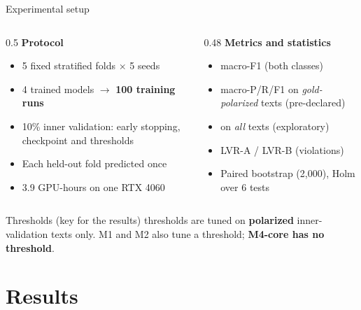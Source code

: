\begin{frame}{Experimental setup}
\begin{columns}[T]
\begin{column}{0.5\textwidth}
\textbf{Protocol}
\begin{itemize}\small
\item 5 fixed stratified folds $\times$ 5 seeds
\item 4 trained models $\to$ \textbf{100 training runs}
\item 10\% inner validation: early stopping, checkpoint and thresholds
\item Each held-out fold predicted once
\item 3.9 GPU-hours on one RTX 4060
\end{itemize}
\end{column}
\begin{column}{0.48\textwidth}
\textbf{Metrics and statistics}
\begin{itemize}\small
\item \DET{} macro-F1 (both classes)
\item \TYPE{} macro-P/R/F1 on \emph{gold-polarized} texts (pre-declared)
\item \TYPE{} on \emph{all} texts (exploratory)
\item LVR-A / LVR-B (violations)
\item Paired bootstrap (2{,}000), Holm over 6 tests
\end{itemize}
\end{column}
\end{columns}
\vspace{6pt}
\begin{alertblock}{Thresholds (key for the results)}
\small \TYPE{} thresholds are tuned on \textbf{polarized} inner-validation texts only.
M1 and M2 also tune a \DET{} threshold; \textbf{M4-core has no \DET{} threshold}.
\end{alertblock}
\end{frame}

\section{Results}


